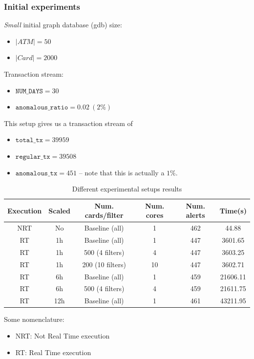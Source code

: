\documentclass[12pt,a4paper]{article}
\begin{document}
\subsubsection{Initial experiments}

\textit{Small} initial graph database (gdb) size:
\begin{itemize}
  \item $|ATM| = 50$
  \item $|Card| = 2000$
\end{itemize}

Transaction stream:
\begin{itemize}
  \item $\texttt{NUM\_DAYS} = 30$
  \item $\texttt{anomalous\_ratio} = 0.02\ (2\%)$ 
\end{itemize}

This setup gives us a transaction stream of 
\begin{itemize}
  \item $\texttt{total\_tx} = 39959$
  \item $\texttt{regular\_tx} = 39508$
  \item $\texttt{anomalous\_tx} = 451$ -- note that this is actually a $1\%$.
\end{itemize}

\begin{table}[H]
\centering
\begin{tabular}{|c|c|c|c|c|c|}
  \hline
  Execution & Scaled   & Num. cards/filter& Num. cores & Num. alerts & Time(s) \\ \hline
  NRT & No & Baseline (all) & 1 & 462 & 44.88 \\ \hline
  RT  & 1h & Baseline (all) & 1 & 447 & 3601.65\\ \hline
  RT  & 1h & 500 (4 filters) & 4 & 447 & 3603.25\\ \hline
  RT  & 1h & 200 (10 filters) & 10 & 447 & 3602.71\\ \hline
  RT  & 6h & Baseline (all) & 1 & 459 & 21606.11 \\ \hline
  RT  & 6h & 500 (4 filters) & 4 & 459 & 21611.75 \\ \hline
  RT  & 12h & Baseline (all) & 1 & 461 & 43211.95 \\ \hline
\end{tabular}
\caption{Different experimental setups results}
\label{table:small-results}
\end{table}

Some nomenclature:
\begin{itemize}
  \item NRT: Not Real Time execution
  \item RT: Real Time execution
\end{itemize}
\end{document}
